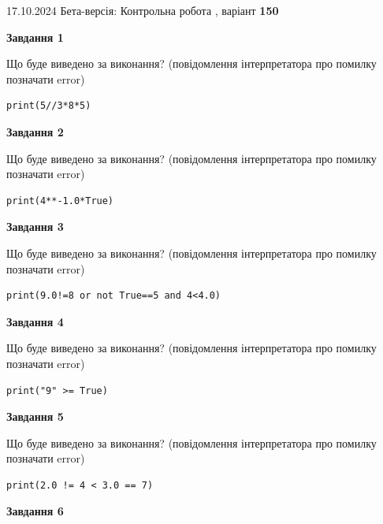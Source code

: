 \documentclass[12pt, ukrainian]{article}
\begin{document}
{\Large{17.10.2024 Бета-версія: Контрольна робота , варіант  \No \textbf { 150 }\par}}
{
\begin {large}
{\begin {center}\textbf{Завдання 1}\end {center}}

Що буде виведено за виконання? (повідомлення інтерпретатора про помилку позначати error)\par
\begin{verbatim}
print(5//3*8*5)
\end{verbatim}

{\begin {center}\textbf{Завдання 2}\end {center}}

Що буде виведено за виконання? (повідомлення інтерпретатора про помилку позначати error)\par
\begin{verbatim}
print(4**-1.0*True)
\end{verbatim}

{\begin {center}\textbf{Завдання 3}\end {center}}

Що буде виведено за виконання? (повідомлення інтерпретатора про помилку позначати error)\par
\begin{verbatim}
print(9.0!=8 or not True==5 and 4<4.0)
\end{verbatim}

{\begin {center}\textbf{Завдання 4}\end {center}}

Що буде виведено за виконання? (повідомлення інтерпретатора про помилку позначати error)\par
\begin{verbatim}
print("9" >= True)
\end{verbatim}

{\begin {center}\textbf{Завдання 5}\end {center}}

Що буде виведено за виконання? (повідомлення інтерпретатора про помилку позначати error)\par
\begin{verbatim}
print(2.0 != 4 < 3.0 == 7)
\end{verbatim}

{\begin {center}\textbf{Завдання 6}\end {center}}


\end{large}}
\end{document}
